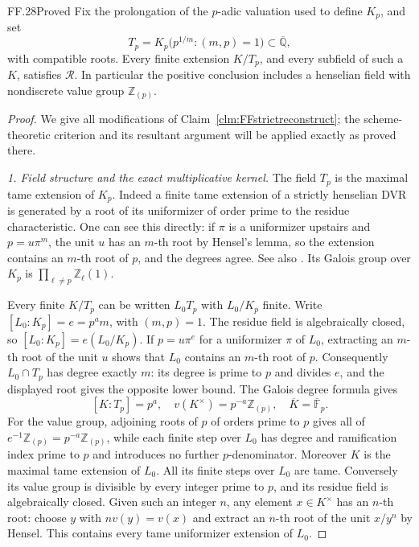 \begin{claim}{FF.28}{Proved}\label{clm:FFtamereconstruct}
Fix the prolongation of the \(p\)-adic valuation used
to define \(K_p\), and set
\[
 T_p=K_p\bigl(p^{1/m}:(m,p)=1\bigr)
        \subset\overline{\mathbb Q},                    \tag{FF.28.1}
\]
with compatible roots. Every finite extension \(K/T_p\),
and every subfield of such a \(K\), satisfies
\(\mathcal R\). In particular the positive conclusion
includes a henselian field with nondiscrete value group
\(\mathbb Z_{(p)}\).
\end{claim}
\begin{proof}
We give all modifications of Claim~\ref{clm:FFstrictreconstruct};
the scheme-theoretic criterion and its resultant argument
will be applied exactly as proved there.

\emph{1. Field structure and the exact multiplicative kernel.}
The field \(T_p\) is the maximal tame extension of
\(K_p\). Indeed a finite tame extension of a strictly
henselian DVR is generated by a root of its uniformizer
of order prime to the residue characteristic. One can
see this directly: if \(\pi\) is a uniformizer upstairs
and \(p=u\pi^m\), the unit \(u\) has an \(m\)-th
root by Hensel's lemma, so the extension contains an
\(m\)-th root of \(p\), and the degrees agree.
See also \citep[Lemmas~15.116.2 and 15.116.7, Tags
09EV and 0EXW]{FF_StacksRamification}.
Its Galois group over \(K_p\) is
\(\prod_{\ell\ne p}\mathbb Z_\ell(1)\).

Every finite \(K/T_p\) can be written \(L_0T_p\)
with \(L_0/K_p\) finite. Write
\([L_0:K_p]=e=p^a m\), with \((m,p)=1\).
The residue field is algebraically closed, so
\([L_0:K_p]=e(L_0/K_p)\). If
\(p=u\pi^e\) for a uniformizer \(\pi\) of \(L_0\),
extracting an \(m\)-th root of the unit \(u\)
shows that \(L_0\) contains an \(m\)-th root of
\(p\). Consequently \(L_0\cap T_p\) has degree
exactly \(m\): its degree is prime to \(p\) and
divides \(e\), and the displayed root gives the
opposite lower bound. The Galois degree formula gives
\[
 [K:T_p]=p^a,
 \quad v(K^\times)=p^{-a}\mathbb Z_{(p)},
 \quad\overline K=\overline{\mathbb F}_p.              \tag{FF.28.2}
\]
For the value group, adjoining roots of \(p\) of
orders prime to \(p\) gives all of
\(e^{-1}\mathbb Z_{(p)}=p^{-a}\mathbb Z_{(p)}\),
while each finite step over \(L_0\) has degree and
ramification index prime to \(p\) and introduces
no further \(p\)-denominator.
Moreover \(K\) is the maximal tame extension of
\(L_0\). All its finite steps over \(L_0\) are tame.
Conversely its value group is divisible by every
integer prime to \(p\), and its residue field is
algebraically closed. Given such an integer \(n\),
any element \(x\in K^\times\) has an \(n\)-th root:
choose \(y\) with \(nv(y)=v(x)\) and extract an
\(n\)-th root of the unit \(x/y^n\) by Hensel.
This contains every tame uniformizer extension of
\(L_0\).


\end{proof}
